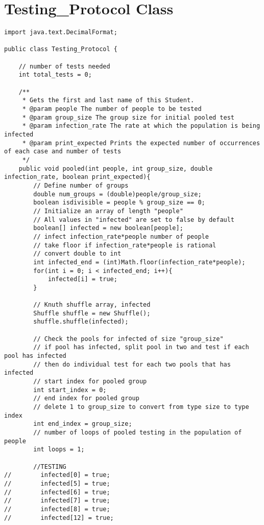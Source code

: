 \documentclass{article}
\begin{document}
\section{Testing\_Protocol Class}
    \begin{lstlisting}
import java.text.DecimalFormat;

public class Testing_Protocol {

    // number of tests needed
    int total_tests = 0;

    /**
     * Gets the first and last name of this Student.
     * @param people The number of people to be tested
     * @param group_size The group size for initial pooled test
     * @param infection_rate The rate at which the population is being infected
     * @param print_expected Prints the expected number of occurrences of each case and number of tests
     */
    public void pooled(int people, int group_size, double infection_rate, boolean print_expected){
        // Define number of groups
        double num_groups = (double)people/group_size;
        boolean isdivisible = people % group_size == 0;
        // Initialize an array of length "people"
        // All values in "infected" are set to false by default
        boolean[] infected = new boolean[people];
        // infect infection_rate*people number of people
        // take floor if infection_rate*people is rational
        // convert double to int
        int infected_end = (int)Math.floor(infection_rate*people);
        for(int i = 0; i < infected_end; i++){
            infected[i] = true;
        }

        // Knuth shuffle array, infected
        Shuffle shuffle = new Shuffle();
        shuffle.shuffle(infected);

        // Check the pools for infected of size "group_size"
        // if pool has infected, split pool in two and test if each pool has infected
        // then do individual test for each two pools that has infected
        // start index for pooled group
        int start_index = 0;
        // end index for pooled group
        // delete 1 to group_size to convert from type size to type index
        int end_index = group_size;
        // number of loops of pooled testing in the population of people
        int loops = 1;

        //TESTING
//        infected[0] = true;
//        infected[5] = true;
//        infected[6] = true;
//        infected[7] = true;
//        infected[8] = true;
//        infected[12] = true;


\end{lstlisting}
\end{document}
